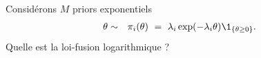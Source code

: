 \begin{exec}
Considérons $M$ priors exponentiels 
\begin{eqnarray*}
\theta & \sim & \pi_i(\theta) \ = \ \lambda_i \exp(-\lambda_i \theta) \1_{\{\theta\geq 0\}}.
\end{eqnarray*}
Quelle est la loi-fusion logarithmique ?
\end{exec}




\clearpage
 